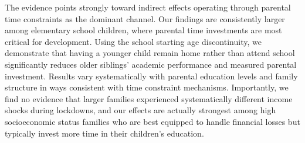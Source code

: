 The evidence points strongly toward indirect effects operating through parental time constraints as the dominant channel. Our findings are consistently larger among elementary school children, where parental time investments are most critical for development. Using the school starting age discontinuity, we demonstrate that having a younger child remain home rather than attend school significantly reduces older siblings' academic performance and measured parental investment. Results vary systematically with parental education levels and family structure in ways consistent with time constraint mechanisms. Importantly, we find no evidence that larger families experienced systematically different income shocks during lockdowns, and our effects are actually strongest among high socioeconomic status families who are best equipped to handle financial losses but typically invest more time in their children's education.


